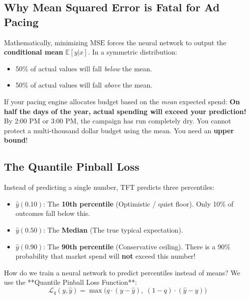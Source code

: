 \documentclass[11pt,a4paper]{article}
\begin{document}
\subsection{Why Mean Squared Error is Fatal for Ad Pacing}
\begin{intuitionbox}
Mathematically, minimizing $\mathrm{MSE}$ forces the neural network to output the \textbf{conditional mean} $\mathbb{E}[y | x]$.
In a symmetric distribution:
\begin{itemize}
    \item 50\% of actual values will fall \textit{below} the mean.
    \item 50\% of actual values will fall \textit{above} the mean.
\end{itemize}
If your pacing engine allocates budget based on the \textit{mean} expected spend:
\textbf{On half the days of the year, actual spending will exceed your prediction!}
By 2:00 PM or 3:00 PM, the campaign has run completely dry. You cannot protect a multi-thousand dollar budget using the mean. You need an \textbf{upper bound}!
\end{intuitionbox}

\subsection{The Quantile Pinball Loss}
Instead of predicting a single number, TFT predicts three percentiles:
\begin{itemize}
    \item $\hat{y}(0.10)$: The \textbf{10th percentile} (Optimistic / quiet floor). Only 10\% of outcomes fall below this.
    \item $\hat{y}(0.50)$: The \textbf{Median} (The true typical expectation).
    \item $\hat{y}(0.90)$: The \textbf{90th percentile} (Conservative ceiling). There is a 90\% probability that market spend will \textbf{not} exceed this number!
\end{itemize}

How do we train a neural network to predict percentiles instead of means? We use the **Quantile Pinball Loss Function**:
\begin{equation}
    \mathcal{L}_q(y, \hat{y}) = \max\Big( q \cdot (y - \hat{y}), \; (1 - q) \cdot (\hat{y} - y) \Big)
\end{equation}
\end{document}
